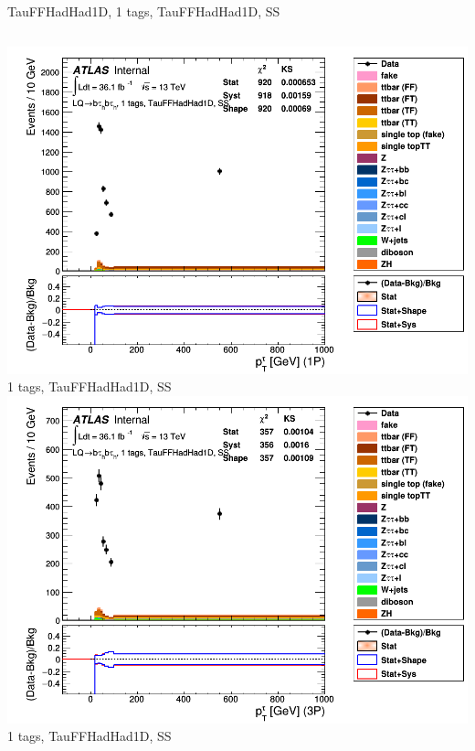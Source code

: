 \begin{frame}{TauFFHadHad1D, 1 tags, TauFFHadHad1D, SS}
  \begin{columns}[c]
    \centering\includegraphics[width=\textwidth]{C_1tag2pjet_0ptv_SS_TauPt1P}\\
    1 tags, TauFFHadHad1D, SS
    \centering\includegraphics[width=\textwidth]{C_1tag2pjet_0ptv_SS_TauPt3P}\\
    1 tags, TauFFHadHad1D, SS
  \end{columns}
  \begin{columns}[c]

\end{columns}
\end{frame}

